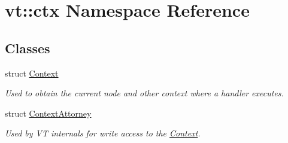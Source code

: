 \hypertarget{namespacevt_1_1ctx}{}\section{vt\+:\+:ctx Namespace Reference}
\label{namespacevt_1_1ctx}
\subsection*{Classes}
\begin{DoxyCompactItemize}
\item 
struct \hyperlink{structvt_1_1ctx_1_1_context}{Context}
\begin{DoxyCompactList}\small\item\em Used to obtain the current node and other context where a handler executes. \end{DoxyCompactList}\item 
struct \hyperlink{structvt_1_1ctx_1_1_context_attorney}{Context\+Attorney}
\begin{DoxyCompactList}\small\item\em Used by VT internals for write access to the \hyperlink{structvt_1_1ctx_1_1_context}{Context}. \end{DoxyCompactList}\end{DoxyCompactItemize}
